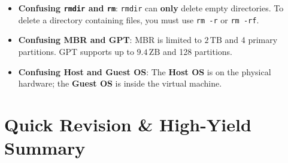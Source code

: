 \begin{commonmistake}
\begin{itemize}
    \item \textbf{Confusing \texttt{rmdir} and \texttt{rm}}: \texttt{rmdir} can \textbf{only} delete empty directories. To delete a directory containing files, you must use \texttt{rm -r} or \texttt{rm -rf}.
    \item \textbf{Confusing MBR and GPT}: MBR is limited to $2\,\text{TB}$ and 4 primary partitions. GPT supports up to $9.4\,\text{ZB}$ and 128 partitions.
    \item \textbf{Confusing Host and Guest OS}: The \textbf{Host OS} is on the physical hardware; the \textbf{Guest OS} is inside the virtual machine.
\end{itemize}
\end{commonmistake}

\section{Quick Revision \& High-Yield Summary}

